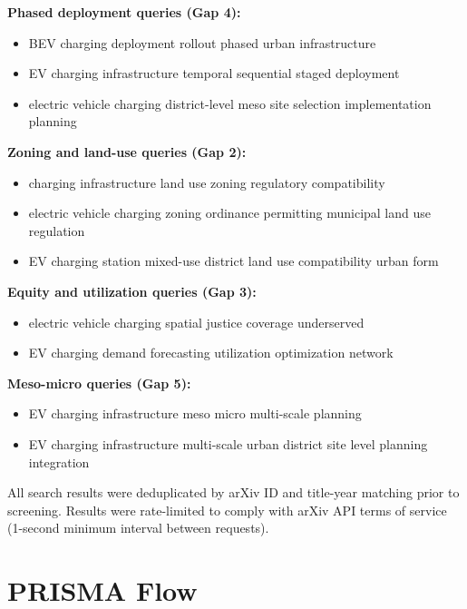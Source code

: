 \documentclass[letterpaper, 12pt, oneside, doublespacing]{Thesis}
\begin{document}
\noindent \textbf{Phased deployment queries (Gap 4):}

\begin{itemize}
  \item BEV charging deployment rollout phased urban infrastructure
  \item EV charging infrastructure temporal sequential staged deployment
  \item electric vehicle charging district-level meso site selection implementation planning
\end{itemize}



\noindent \textbf{Zoning and land-use queries (Gap 2):}

\begin{itemize}
  \item charging infrastructure land use zoning regulatory compatibility
  \item electric vehicle charging zoning ordinance permitting municipal land use regulation
  \item EV charging station mixed-use district land use compatibility urban form
\end{itemize}



\noindent \textbf{Equity and utilization queries (Gap 3):}

\begin{itemize}
  \item electric vehicle charging spatial justice coverage underserved
  \item EV charging demand forecasting utilization optimization network
\end{itemize}



\noindent \textbf{Meso-micro queries (Gap 5):}

\begin{itemize}
  \item EV charging infrastructure meso micro multi-scale planning
  \item EV charging infrastructure multi-scale urban district site level planning integration
\end{itemize}


All search results were deduplicated by arXiv ID and title-year matching prior to screening. Results were rate-limited to comply with arXiv API terms of service (1-second minimum interval between requests).

\section{PRISMA Flow}
\end{document}
